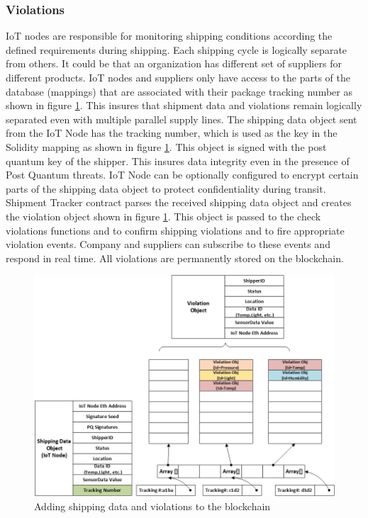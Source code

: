\subsubsection{Violations} \label{SV} 
IoT nodes are responsible for monitoring shipping conditions according the defined requirements during shipping. Each shipping cycle is logically separate from others. It could be that an organization has different set of suppliers for different products. IoT nodes and suppliers only have access to the parts of the database (mappings) that are associated with their package tracking number as shown in figure \ref{fig:violation-impl}. This insures that shipment data and violations remain logically separated even with multiple parallel supply lines. The shipping data object sent from the IoT Node has the tracking number, which is used as the key in the Solidity mapping as shown in figure \ref{fig:violation-impl}. This object is signed with the post quantum key of the shipper. This insures data integrity even in the presence of Post Quantum threats. IoT Node can be optionally configured to encrypt certain parts of the shipping data object to protect confidentiality during transit. Shipment Tracker contract parses the received shipping data object and creates the violation object shown in figure \ref{fig:violation-impl}. This object is passed to the check violations functions and to confirm shipping violations and to fire appropriate violation events. Company and suppliers can subscribe to these events and respond in real time. All violations are permanently stored on the blockchain.
\vspace{0.1cm}
\begin{figure}[h]
	\centering
    \includegraphics[width=160mm,scale=1]{figs/violation-impl}
	\caption{Adding shipping data and violations to the blockchain}
	\label{fig:violation-impl} 
\end{figure} 
\clearpage
